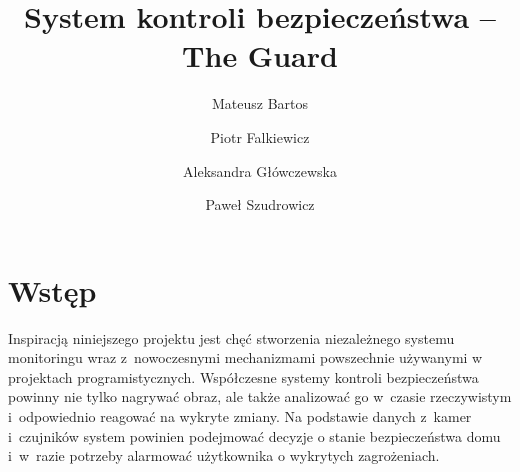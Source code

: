 \documentclass[polish,bachelor,a4paper,oneside]{ppfcmthesis}
\author{%
Mateusz Bartos \album{122437} \and
Piotr Falkiewicz \album{122563} \and
Aleksandra Główczewska \album{122494} \and
Paweł Szudrowicz \album{122445}}
\title{System kontroli bezpieczeństwa – The Guard}                   %
\begin{document}
    \frontmatter\pagestyle{empty}%
    \maketitle\cleardoublepage%
    \thispagestyle{empty}\vspace*{\fill}%
    \begin{center}
    \end{center}%
    \vfill\cleardoublepage%


    \cleardoublepage
    \begingroup
    \makeatletter
    \let\ps@plain\ps@empty
    \makeatother

    \pagestyle{empty}

    \cleardoublepage
    
    \pagestyle{empty}
    \cleardoublepage
    \endgroup


    \pagestyle{ppfcmthesis}%
    \tableofcontents \cleardoublepage%
    \mainmatter

    \chapter{Wstęp}
    Inspiracją niniejszego projektu jest chęć stworzenia niezależnego systemu monitoringu wraz z~nowoczesnymi mechanizmami powszechnie używanymi w projektach programistycznych.
    Współczesne systemy kontroli bezpieczeństwa powinny nie tylko nagrywać obraz, ale także analizować go w~czasie rzeczywistym i~odpowiednio reagować na wykryte zmiany. Na podstawie danych z~kamer i~czujników system powinien podejmować decyzje o stanie bezpieczeństwa domu i~w~razie potrzeby alarmować użytkownika o wykrytych zagrożeniach.
\end{document}
